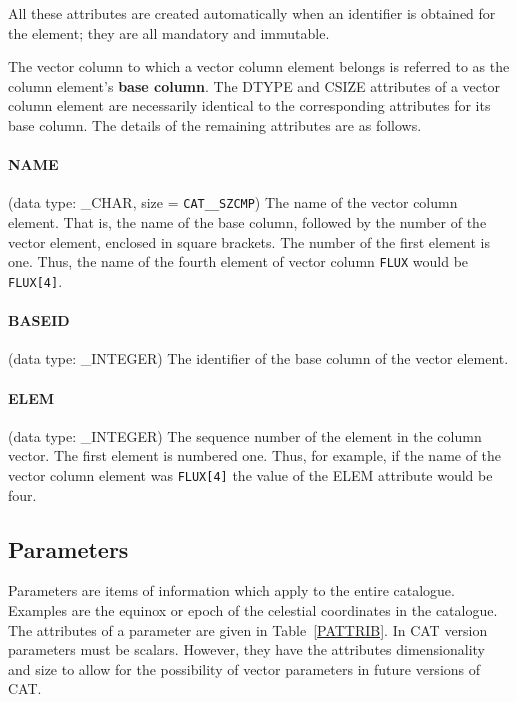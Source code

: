 All these attributes are created automatically when an identifier is
obtained for the element; they are all mandatory and immutable.

The vector column to which a vector column element belongs is
referred to as the column element's {\bf base column}. The DTYPE and
CSIZE attributes of a vector column element are necessarily identical
to the corresponding attributes for its base column. The details of the
remaining attributes are as follows.

\paragraph{NAME}
(data type: \_CHAR, size = {\tt CAT\_\_SZCMP})
The name of the vector column element. That is, the name of the base
column, followed by the number of the vector element, enclosed in
square brackets. The number of the first element is one. Thus, the name 
of the fourth element of vector column {\tt FLUX} would be {\tt
FLUX[4]}.

\paragraph{BASEID}
(data type: \_INTEGER)
The identifier of the base column of the vector element.

\paragraph{ELEM}
(data type: \_INTEGER)
The sequence number of the element in the column vector. The first 
element is numbered one. Thus, for example, if the name of the vector
column element was {\tt FLUX[4]} the value of the ELEM attribute 
would be four.


\subsection{\label{PARS}Parameters}

Parameters are items of information which apply to the entire catalogue.
Examples are the equinox or epoch of the celestial coordinates in the
catalogue. The attributes of a parameter are given in 
Table~\ref{PATTRIB}. In CAT version \CATversion parameters must be 
scalars. However, they have the attributes dimensionality and size to 
allow for the possibility of vector parameters in future versions of 
CAT.

